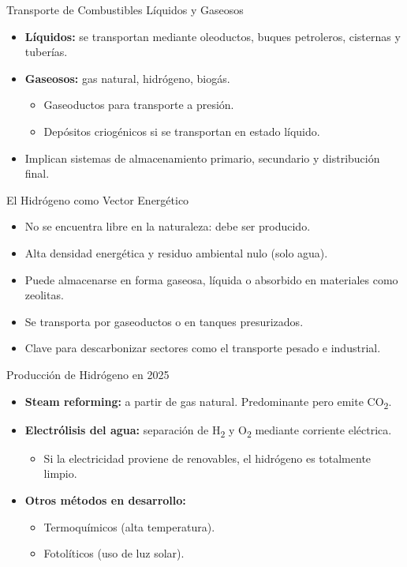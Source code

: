 \documentclass[main.tex]{subfiles}
\begin{document}
\begin{frame}{Transporte de Combustibles Líquidos y Gaseosos}
  \begin{itemize}
    \item \textbf{Líquidos:} se transportan mediante oleoductos, buques petroleros, cisternas y tuberías.
    \item \textbf{Gaseosos:} gas natural, hidrógeno, biogás.
    \begin{itemize}
      \item Gaseoductos para transporte a presión.
      \item Depósitos criogénicos si se transportan en estado líquido.
    \end{itemize}
    \item Implican sistemas de almacenamiento primario, secundario y distribución final.
  \end{itemize}
\end{frame}

\begin{frame}{El Hidrógeno como Vector Energético}
  \begin{itemize}
    \item No se encuentra libre en la naturaleza: debe ser producido.
    \item Alta densidad energética y residuo ambiental nulo (solo agua).
    \item Puede almacenarse en forma gaseosa, líquida o absorbido en materiales como zeolitas.
    \item Se transporta por gaseoductos o en tanques presurizados.
    \item Clave para descarbonizar sectores como el transporte pesado e industrial.
  \end{itemize}
\end{frame}

\begin{frame}{Producción de Hidrógeno en 2025}
  \begin{itemize}
    \item \textbf{Steam reforming:} a partir de gas natural. Predominante pero emite CO\textsubscript{2}.
    \item \textbf{Electrólisis del agua:} separación de H\textsubscript{2} y O\textsubscript{2} mediante corriente eléctrica.
    \begin{itemize}
      \item Si la electricidad proviene de renovables, el hidrógeno es totalmente limpio.
    \end{itemize}
    \item \textbf{Otros métodos en desarrollo:}
    \begin{itemize}
      \item Termoquímicos (alta temperatura).
      \item Fotolíticos (uso de luz solar).
    \end{itemize}
  \end{itemize}
\end{frame}
\end{document}
